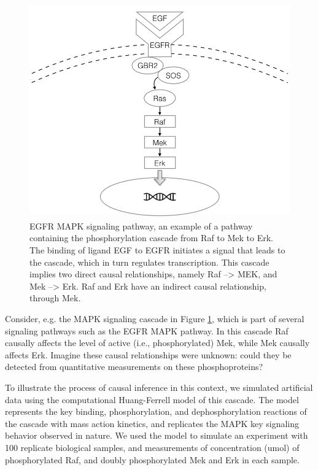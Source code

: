 \documentclass[journal=jacsat,manuscript=article]{achemso}
\begin{document}
\begin{figure}[!tpb]
\centerline{\includegraphics[width=.5\textwidth]{figs/egfr.png}}
\caption{EGFR MAPK signaling pathway, an example of a pathway containing the phosphorylation cascade from Raf to Mek to Erk.  The binding of ligand EGF to EGFR initiates a signal that leads to the cascade, which in turn regulates transcription.  This cascade implies two direct causal relationships, namely Raf --> MEK, and Mek --> Erk.  Raf and Erk have an indirect causal relationship, through Mek.\label{mapk}}
\end{figure}

Consider, e.g. the MAPK signaling cascade in Figure \ref{mapk}, which is part of several signaling pathways such as the EGFR MAPK pathway\cite{holbro2004erbb}. In this cascade Raf causally affects the level of active (i.e., phosphorylated) Mek, while Mek causally affects Erk. Imagine these causal relationships were unknown: could they be detected from quantitative measurements on these phosphoproteins?  

To illustrate the process of causal inference in this context, we simulated artificial data using the computational Huang-Ferrell model \cite{huang1996ultrasensitivity} of this cascade. The model represents the key binding, phosphorylation, and dephosphorylation reactions of the cascade with mass action kinetics, and replicates the MAPK key signaling behavior observed in nature.  We used the model to simulate an experiment with 100 replicate biological samples, and measurements of concentration (umol) of phosphorylated Raf, and doubly phosphorylated Mek and Erk in each sample. 
\end{document}
